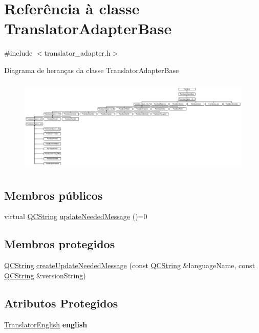 \hypertarget{class_translator_adapter_base}{\section{Referência à classe Translator\-Adapter\-Base}
\label{class_translator_adapter_base}
}


{\ttfamily \#include $<$translator\-\_\-adapter.\-h$>$}

Diagrama de heranças da classe Translator\-Adapter\-Base\begin{figure}[H]
\begin{center}
\leavevmode
\includegraphics[height=4.552845cm]{class_translator_adapter_base}
\end{center}
\end{figure}
\subsection*{Membros públicos}
\begin{DoxyCompactItemize}
\item 
virtual \hyperlink{class_q_c_string}{Q\-C\-String} \hyperlink{class_translator_adapter_base_addce2e9c8b4b31214857d30e816d0b9e}{update\-Needed\-Message} ()=0
\end{DoxyCompactItemize}
\subsection*{Membros protegidos}
\begin{DoxyCompactItemize}
\item 
\hyperlink{class_q_c_string}{Q\-C\-String} \hyperlink{class_translator_adapter_base_a5a2e61bbeb05968eed2d1e7fa9030c87}{create\-Update\-Needed\-Message} (const \hyperlink{class_q_c_string}{Q\-C\-String} \&language\-Name, const \hyperlink{class_q_c_string}{Q\-C\-String} \&version\-String)
\end{DoxyCompactItemize}
\subsection*{Atributos Protegidos}
\begin{DoxyCompactItemize}
\item 
\hypertarget{class_translator_adapter_base_a605bc398d985cf08eb4814c3b045e4a9}{\hyperlink{class_translator_english}{Translator\-English} {\bfseries english}}\label{class_translator_adapter_base_a605bc398d985cf08eb4814c3b045e4a9}

\end{DoxyCompactItemize}


